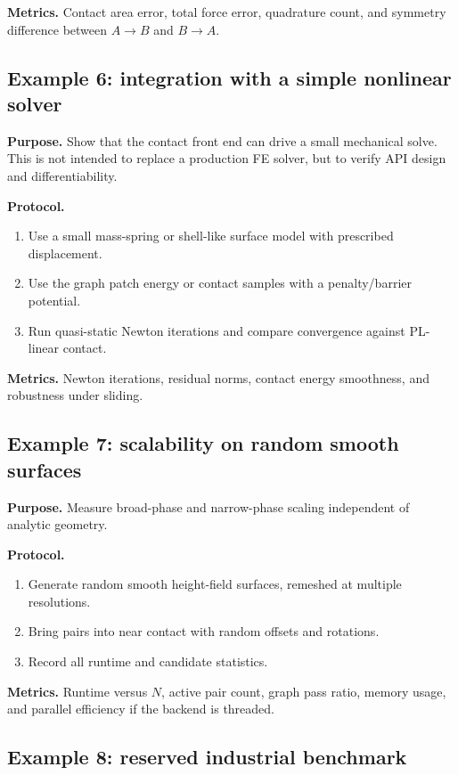 \documentclass[preprint,12pt]{elsarticle}
\begin{document}
\textbf{Metrics.} Contact area error, total force error, quadrature count, and symmetry difference between $A\rightarrow B$ and $B\rightarrow A$.

\subsection{Example 6: integration with a simple nonlinear solver}

\textbf{Purpose.} Show that the contact front end can drive a small mechanical solve. This is not intended to replace a production FE solver, but to verify API design and differentiability.

\textbf{Protocol.}
\begin{enumerate}[leftmargin=*]
    \item Use a small mass-spring or shell-like surface model with prescribed displacement.
    \item Use the graph patch energy or contact samples with a penalty/barrier potential.
    \item Run quasi-static Newton iterations and compare convergence against PL-linear contact.
\end{enumerate}

\textbf{Metrics.} Newton iterations, residual norms, contact energy smoothness, and robustness under sliding.

\subsection{Example 7: scalability on random smooth surfaces}

\textbf{Purpose.} Measure broad-phase and narrow-phase scaling independent of analytic geometry.

\textbf{Protocol.}
\begin{enumerate}[leftmargin=*]
    \item Generate random smooth height-field surfaces, remeshed at multiple resolutions.
    \item Bring pairs into near contact with random offsets and rotations.
    \item Record all runtime and candidate statistics.
\end{enumerate}

\textbf{Metrics.} Runtime versus $N$, active pair count, graph pass ratio, memory usage, and parallel efficiency if the backend is threaded.

\subsection{Example 8: reserved industrial benchmark}
\end{document}
